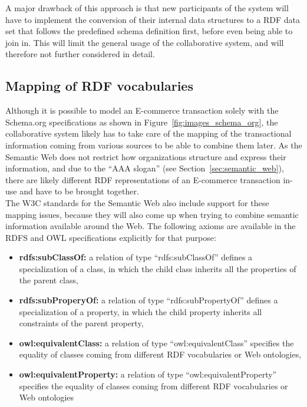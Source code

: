 A major drawback of this approach is that new participants of the system will have to implement the conversion of their internal data structures to a \gls{RDF} data set that follows the predefined schema definition first, before even being able to join in. This will limit the general usage of the collaborative system, and will therefore not further considered in detail.


\subsection{Mapping of \gls{RDF} vocabularies}

Although it is possible to model an \gls{E-commerce} transaction solely with the Schema.org specifications as shown in Figure~\ref{fig:images_schema_org}, the collaborative system likely has to take care of the mapping of the transactional information coming from various sources to be able to combine them later. As the Semantic Web does not restrict how organizations structure and express their information, and due to the ``AAA slogan'' (see Section~\ref{sec:semantic_web}), there are likely different \gls{RDF} representations of an \gls{E-commerce} transaction in-use and have to be brought together. \\

The \gls{W3C} standards for the Semantic Web also include support for these mapping issues, because they will also come up when trying to combine semantic information available around the Web. The following axioms are available in the \gls{RDFS} and \gls{OWL} specifications explicitly for that purpose: \@

\begin{itemize}
	\item \textbf{rdfs:subClassOf:} a relation of type ``rdfs:subClassOf'' defines a specialization of a class, in which the child class inherits all the properties of the parent class,
  \item \textbf{rdfs:subProperyOf:} a relation of type ``rdfs:subPropertyOf'' defines a specialization of a property, in which the child property inherits all constraints of the parent property,
  \item \textbf{owl:equivalentClass:} a relation of type ``owl:equivalentClass'' specifies the equality of classes coming from different \gls{RDF} vocabularies or Web ontologies,
  \item \textbf{owl:equivalentProperty:} a relation of type ``owl:equivalentProperty'' specifies the equality of classes coming from different \gls{RDF} vocabularies or Web ontologies
\end{itemize}

